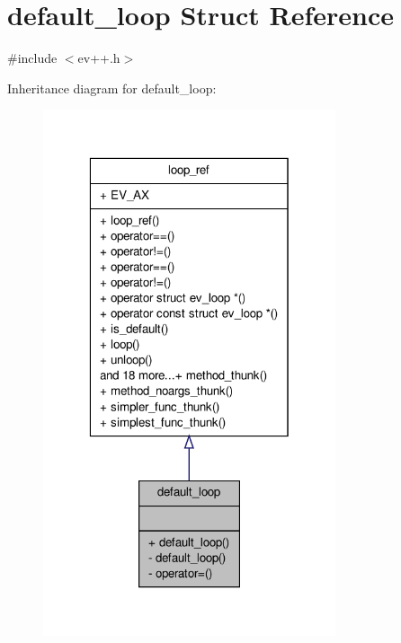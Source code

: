 \hypertarget{structev_1_1default__loop}{\section{default\-\_\-loop \-Struct \-Reference}
\label{structev_1_1default__loop}
}


{\ttfamily \#include $<$ev++.\-h$>$}



\-Inheritance diagram for default\-\_\-loop\-:
\nopagebreak
\begin{figure}[H]
\begin{center}
\leavevmode
\includegraphics[width=244pt]{structev_1_1default__loop__inherit__graph}
\end{center}
\end{figure}


